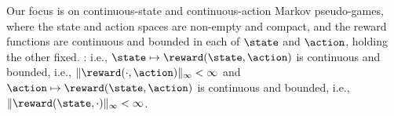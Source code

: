 

Our focus is on continuous-state and continuous-action Markov pseudo-games, where
the state and action spaces
are non-empty and compact, and the reward functions are continuous and bounded in each of $\state$ and $\action$, holding the other fixed.
: i.e.,
$\state \mapsto \reward (\state, \action)$ is continuous and bounded, i.e., $\| \reward (\cdot, \action) \|_{\infty} 
< \infty$ and $\action \mapsto \reward (\state, \action)$ is continuous and bounded, i.e., $\| \reward (\state, \cdot) \|_{\infty} 
< \infty$.
\fi

